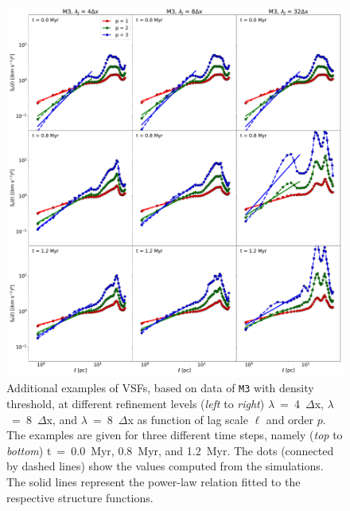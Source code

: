 \documentclass{aa}		%
\begin{document}
 	
\begin{figure}
    \centering
    \includegraphics[width=\textwidth]{app_examples_jeans_s_l.pdf}
    \caption{
        Additional examples of VSFs, based on data of \texttt{M3} with density threshold, at different refinement levels (\textit{left} to \textit{right}) $\lambda$~=~4~$\Delta$x, $\lambda$~=~8~$\Delta$x, and $\lambda$~=~8~$\Delta$x as function of lag scale $\ell$ and order $p$. 
        The examples are given for three different time steps, namely (\textit{top} to \textit{bottom}) t~=~0.0~Myr, 0.8~Myr, and 1.2~Myr.
        The dots (connected by dashed lines) show the values computed from the simulations. 
        The solid lines represent the power-law relation fitted to the respective structure functions.
    }
    \label{pic:appInertial:examples_jeans_s_vs_l}
\end{figure}
\end{document}
